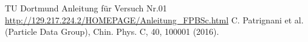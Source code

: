 \newpage
 \begin{thebibliography}{WissOnl}
 	 TU Dortmund Anleitung für Versuch Nr.01 \url{http://129.217.224.2/HOMEPAGE/Anleitung_FPBSc.html}
 	 C. Patrignani et al. (Particle Data Group), Chin. Phys. C, 40, 100001 (2016).
	\end{thebibliography}





